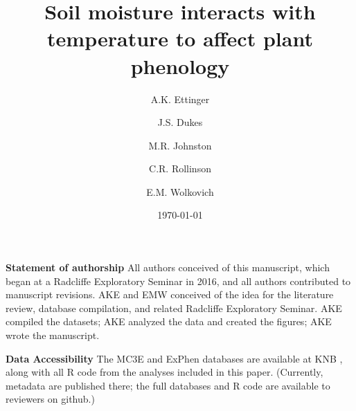 \documentclass{article}
\begin{document}


\title{Soil moisture interacts with temperature to affect plant phenology}
\begin{singlespace}

\author[1,2,a]{A.K. Ettinger}
\author[3,b]{J.S. Dukes}
\author[4,c]{M.R. Johnston}
\author[5,d]{C.R. Rollinson}
\author[1,4,6,e]{E.M. Wolkovich}













\date{\today}
\maketitle %

\textbf{Statement of authorship} 
All authors conceived of this manuscript, which began at a Radcliffe Exploratory Seminar in 2016, and all authors contributed to manuscript revisions. AKE and EMW conceived of the idea for the literature review, database compilation, and related Radcliffe Exploratory Seminar. AKE compiled the datasets; AKE analyzed the data and created the figures; AKE wrote the manuscript.

\textbf{Data Accessibility} %
The MC3E and ExPhen databases are available at KNB \citep{ettinger2018}, along with all R code from the analyses included in this paper. (Currently, metadata are published there; the full databases and R code are available to reviewers on github.) 


\end{singlespace}
\end{document}
